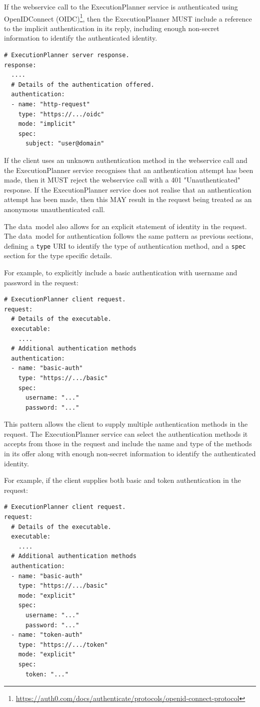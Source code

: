 \documentclass[11pt,a4paper]{ivoa}
\newcommand{\datamodel} {data~model}
\newcommand{\webservice} {webservice}
\newcommand{\execplanner} {ExecutionPlanner}
\newcommand{\codeword}[1] {\texttt{#1}}
\newcommand{\footurl}[1] {\footnote{\url{#1}}}
\begin{document}
If the \webservice{} call to the \execplanner{} service is authenticated
using OpenIDConnect
(OIDC)\footurl{https://auth0.com/docs/authenticate/protocols/openid-connect-protocol},
then the \execplanner{} MUST include a reference to the implicit
authentication in its reply, including enough non-secret
information to identify the authenticated identity.

\begin{lstlisting}[]
# ExecutionPlanner server response.
response:
  ....
  # Details of the authentication offered.
  authentication:
  - name: "http-request"
    type: "https://.../oidc"
    mode: "implicit"
    spec:
      subject: "user@domain"
\end{lstlisting}

If the client uses an unknown authentication method in the \webservice{} call and
the \execplanner{} service recognises that an anthentication attempt has been made,
then it MUST reject the \webservice{} call with a 401 "Unauthenticated" response.
If the \execplanner{} service does not realise that an anthentication attempt has been made,
then this MAY result in the request being treated as an anonymous unauthenticated call.

The \datamodel{} also allows for an explicit statement of identity in the request.
The \datamodel{} for authentication follows the same pattern as previous sections,
defining a \codeword{type} URI to identify the type of authentication method,
and a \codeword{spec} section for the type specific details.

For example, to explicitly include a basic authentication with username and password
in the request:
\begin{lstlisting}[]
# ExecutionPlanner client request.
request:
  # Details of the executable.
  executable:
    ....
  # Additional authentication methods
  authentication:
  - name: "basic-auth"
    type: "https://.../basic"
    spec:
      username: "..."
      password: "..."
\end{lstlisting}

This pattern allows the client to supply multiple authentication methods
in the request. The \execplanner{} service can select the authentication
methods it accepts from those in the request and include the name and
type of the methods in its offer along with enough non-secret
information to identify the authenticated identity.

For example, if the client supplies both basic and token authentication
in the request:
\begin{lstlisting}[]
# ExecutionPlanner client request.
request:
  # Details of the executable.
  executable:
    ....
  # Additional authentication methods
  authentication:
  - name: "basic-auth"
    type: "https://.../basic"
    mode: "explicit"
    spec:
      username: "..."
      password: "..."
  - name: "token-auth"
    type: "https://.../token"
    mode: "explicit"
    spec:
      token: "..."
\end{lstlisting}
\end{document}
